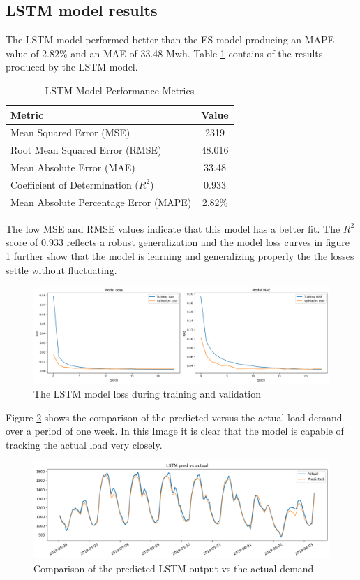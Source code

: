 \subsection{LSTM model results}
The LSTM model performed better than the ES model producing an MAPE value of 2.82\% and an MAE of 33.48 Mwh.  Table \ref{tab:lstm_performance} contains of the results produced by the LSTM model.
\begin{table}[h]
	\centering
	
	\begin{tabular}{lc}
		\hline
		\textbf{Metric} & \textbf{Value} \\
		\hline
		Mean Squared Error (MSE) & 2319 \\
		Root Mean Squared Error (RMSE) &48.016 \\
		Mean Absolute Error (MAE) & 33.48 \\
		Coefficient of Determination ($R^2$) & 0.933 \\
		Mean Absolute Percentage Error (MAPE) & 2.82\% \\
		\hline
	\end{tabular}
	\caption{LSTM Model Performance Metrics}
	\label{tab:lstm_performance}
\end{table}
 The low MSE and RMSE values indicate that this model has a better fit. The $R^2$ score of 0.933 reflects a robust generalization and the model loss curves in figure \ref{fig:lstmmodel-loss} further show that the model is learning and generalizing properly the the losses settle without fluctuating. 
 \begin{figure}[h]
 	\centering
 	\includegraphics[width=0.9\linewidth]{"Chapters/images/results/lstm_model loss"}
 	\caption{The LSTM model loss during training and validation}
 	\label{fig:lstmmodel-loss}
 \end{figure}
 Figure \ref{fig:lstmpredictedvsactual} shows the comparison of the predicted versus the actual load demand over a period of one week. In this Image it is clear that the model is capable of tracking the actual load very closely.
 \begin{figure}[h]
 	\centering
 	\includegraphics[width=0.5\linewidth]{Chapters/images/results/lstm_predicted_vs_actual}
 	\caption{Comparison of the predicted LSTM output vs the actual demand}
 	\label{fig:lstmpredictedvsactual}
 \end{figure}
 
